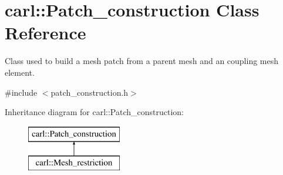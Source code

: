 \hypertarget{classcarl_1_1_patch__construction}{}\section{carl\+:\+:Patch\+\_\+construction Class Reference}
\label{classcarl_1_1_patch__construction}


Class used to build a mesh patch from a parent mesh and an coupling mesh element.  




{\ttfamily \#include $<$patch\+\_\+construction.\+h$>$}

Inheritance diagram for carl\+:\+:Patch\+\_\+construction\+:\begin{figure}[H]
\begin{center}
\leavevmode
\includegraphics[height=2.000000cm]{classcarl_1_1_patch__construction}
\end{center}
\end{figure}
